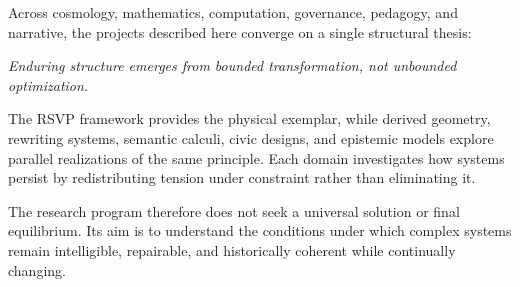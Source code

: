 \documentclass[12pt]{article}
\begin{document}
Across cosmology, mathematics, computation, governance, pedagogy, and narrative, the projects described here converge on a single structural thesis:

\begin{center}
\emph{Enduring structure emerges from bounded transformation, not unbounded optimization.}
\end{center}

The RSVP framework provides the physical exemplar, while derived geometry, rewriting systems, semantic calculi, civic designs, and epistemic models explore parallel realizations of the same principle. Each domain investigates how systems persist by redistributing tension under constraint rather than eliminating it.

The research program therefore does not seek a universal solution or final equilibrium. Its aim is to understand the conditions under which complex systems remain intelligible, repairable, and historically coherent while continually changing.
\end{document}
